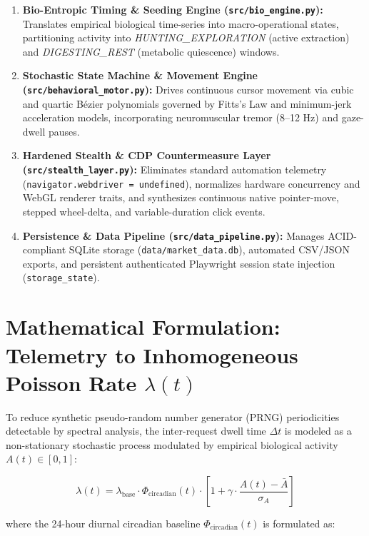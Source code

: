 \documentclass[11pt,a4paper]{article}
\begin{document}
\begin{enumerate}
    \item \textbf{Bio-Entropic Timing \& Seeding Engine (\texttt{src/bio\_engine.py}):} 
    Translates empirical biological time-series into macro-operational states, partitioning activity into \textit{HUNTING\_EXPLORATION} (active extraction) and \textit{DIGESTING\_REST} (metabolic quiescence) windows.
    
    \item \textbf{Stochastic State Machine \& Movement Engine (\texttt{src/behavioral\_motor.py}):} 
    Drives continuous cursor movement via cubic and quartic Bézier polynomials governed by Fitts's Law and minimum-jerk acceleration models, incorporating neuromuscular tremor (8--12 Hz) and gaze-dwell pauses.
    
    \item \textbf{Hardened Stealth \& CDP Countermeasure Layer (\texttt{src/stealth\_layer.py}):} 
    Eliminates standard automation telemetry (\texttt{navigator.webdriver = undefined}), normalizes hardware concurrency and WebGL renderer traits, and synthesizes continuous native pointer-move, stepped wheel-delta, and variable-duration click events.
    
    \item \textbf{Persistence \& Data Pipeline (\texttt{src/data\_pipeline.py}):} 
    Manages ACID-compliant SQLite storage (\texttt{data/market\_data.db}), automated CSV/JSON exports, and persistent authenticated Playwright session state injection (\texttt{storage\_state}).
\end{enumerate}

\section{Mathematical Formulation: Telemetry to Inhomogeneous Poisson Rate $\lambda(t)$}

To reduce synthetic pseudo-random number generator (PRNG) periodicities detectable by spectral analysis, the inter-request dwell time $\Delta t$ is modeled as a non-stationary stochastic process modulated by empirical biological activity $A(t) \in [0, 1]$:

\begin{equation}
\lambda(t) = \lambda_{\text{base}} \cdot \Phi_{\text{circadian}}(t) \cdot \left[1 + \gamma \cdot \frac{A(t) - \bar{A}}{\sigma_A}\right]
\end{equation}

\noindent where the 24-hour diurnal circadian baseline $\Phi_{\text{circadian}}(t)$ is formulated as:
\end{document}
